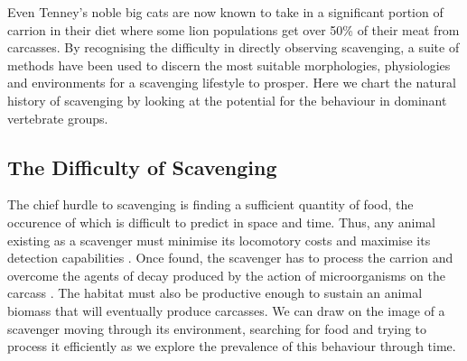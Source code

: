 \documentclass[a4paper,12pt]{article}
\begin{document}
Even Tenney’s noble big cats are now known to take in a significant portion of carrion in their diet where some lion populations get over 50\% of their meat from carcasses.
By recognising the difficulty in directly observing scavenging, a suite of methods have been used to discern the most suitable morphologies, physiologies and environments for a scavenging lifestyle to prosper.
Here we chart the natural history of scavenging by looking at the potential for the behaviour in dominant vertebrate groups.

\subsection*{The Difficulty of Scavenging} %
The chief hurdle to scavenging is finding a sufficient quantity of food, the occurence of which is difficult to predict in space and time. Thus, any animal existing as a scavenger must minimise its locomotory costs and maximise its detection capabilities \citep{ruxton2004obligate}.
Once found, the scavenger has to process the carrion and overcome the agents of decay produced by the action of microorganisms on the carcass \citep{ruxton2014fruit}. 
The habitat must also be productive enough to sustain an animal biomass that will eventually produce carcasses.
We can draw on the image of a scavenger moving through its environment, searching for food and trying to process it efficiently as we explore the prevalence of this behaviour through time. 
\end{document}
